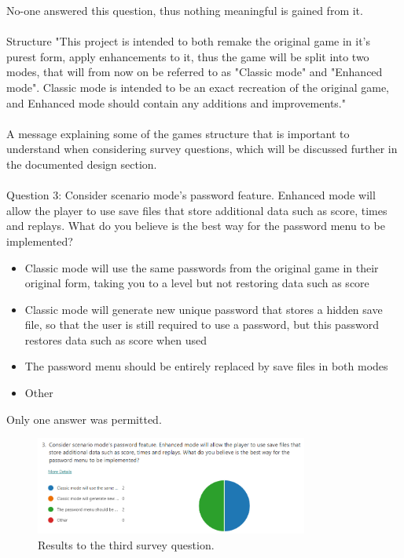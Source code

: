 \documentclass{article}
\begin{document}
No-one answered this question, thus nothing meaningful is gained from it.
\\\\
Structure
"This project is intended to both remake the original game in it's purest form, apply enhancements to it, thus the game will be split into two modes, that will from now on be referred to as "Classic mode" and "Enhanced mode". Classic mode is intended to be an exact recreation of the original game, and Enhanced mode should contain any additions and improvements."
\\\\
A message explaining some of the games structure that is important to understand when considering survey questions, which will be discussed further in the documented design section.
\\\\
Question 3: Consider scenario mode's password feature. Enhanced mode will allow the player to use save files that store additional data such as score, times and replays. What do you believe is the best way for the password menu to be implemented?
\begin{itemize}
    \renewcommand\labelitemi{--}
    \item Classic mode will use the same passwords from the original game in their original form, taking you to a level but not restoring data such as score
    \item Classic mode will generate new unique password that stores a hidden save file, so that the user is still required to use a password, but this password restores data such as score when used
    \item The password menu should be entirely replaced by save files in both modes
    \item Other
\end{itemize}
Only one answer was permitted.

\begin{figure}[h]
    \centering
    \includegraphics[width=0.8\textwidth]{survey3.png}
    \caption{\label{fig:survey3}Results to the third survey question.}
\end{figure}
\end{document}
